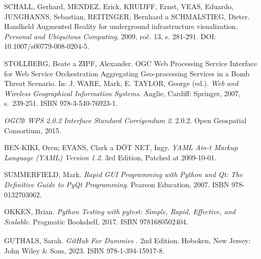 \documentclass[a4paper,oneside,12pt]{book}
\begin{document}
\begin{thebibliography}{1}
SCHALL, Gerhard, MENDEZ, Erick, KRUIJFF, Ernst, VEAS, Eduardo, JUNGHANNS, Sebastian, REITINGER, Bernhard a SCHMALSTIEG, Dieter.  
Handheld Augmented Reality for underground infrastructure visualization.  
\textit{Personal and Ubiquitous Computing}, 2009, roč. 13, s. 281-291.  
DOI: 10.1007/s00779-008-0204-5.  

STOLLBERG, Beate a ZIPF, Alexander. OGC Web Processing Service Interface for Web Service Orchestration Aggregating Geo-processing Services in a Bomb Threat Scenario. In: J. WARE, Mark, E. TAYLOR, George (ed.). \textit{Web and Wireless Geographical Information Systems}. Anglie, Cardiff: Springer, 2007, s.~239-251. ISBN 978-3-540-76923-1.

\textit{OGC® WPS 2.0.2 Interface Standard Corrigendum 2}. 2.0.2. Open Geospatial Consortium, 2015.

BEN-KIKI, Oren; EVANS, Clark a DÖT NET, Ingy. \textit{YAML Ain-t Markup Language (YAML) Version 1.2}. 3rd Edition, Patched at 2009-10-01.

SUMMERFIELD, Mark. \textit{Rapid GUI Programming with Python and Qt: The Definitive Guide to PyQt Programming}. Pearson Education, 2007. ISBN 978-0132703062.

OKKEN, Brian. \textit{Python Testing with pytest: Simple, Rapid, Effective, and Scalable}. Pragmatic Bookshelf, 2017. ISBN 9781680502404.

GUTHALS, Sarah. \textit{GitHub\texorpdfstring{\textsuperscript{\textregistered}}{ (R)} For Dummies \texorpdfstring{\textsuperscript{\textregistered}}{(R)}}. 2nd Edition. Hoboken, New Jersey: John Wiley \& Sons, 2023. ISBN 978-1-394-15917-8.

\end{thebibliography}
\end{document}
